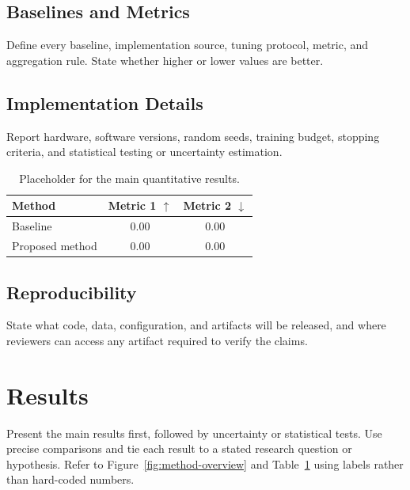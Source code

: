 \documentclass[sigconf,anonymous,review]{acmart}
\begin{document}
\subsection{Baselines and Metrics}
\label{sec:baselines}

Define every baseline, implementation source, tuning protocol, metric, and
aggregation rule. State whether higher or lower values are better.

\subsection{Implementation Details}
\label{sec:implementation}

Report hardware, software versions, random seeds, training budget, stopping
criteria, and statistical testing or uncertainty estimation.

\begin{table}[t]
  \caption{Placeholder for the main quantitative results.}
  \label{tab:results}
  \centering
  \begin{tabular}{lcc}
    \toprule
    Method & Metric 1 $\uparrow$ & Metric 2 $\downarrow$ \\
    \midrule
    Baseline & 0.00 & 0.00 \\
    Proposed method & 0.00 & 0.00 \\
    \bottomrule
  \end{tabular}
\end{table}

\subsection{Reproducibility}
\label{sec:reproducibility}

State what code, data, configuration, and artifacts will be released, and
where reviewers can access any artifact required to verify the claims.

\section{Results}
\label{sec:results}

Present the main results first, followed by uncertainty or statistical tests.
Use precise comparisons and tie each result to a stated research question or
hypothesis. Refer to Figure~\ref{fig:method-overview} and
Table~\ref{tab:results} using labels rather than hard-coded numbers.
\end{document}
